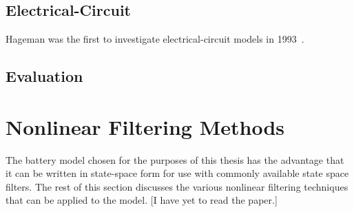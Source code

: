 \documentclass[../zhang_thesis.tex]{subfiles}
\begin{document}
\subsection{Electrical-Circuit}

Hageman was the first to investigate electrical-circuit models in 1993~\cite{hageman93}.

\subsection{Evaluation}

\cite{chen06}


\section{Nonlinear Filtering Methods}
\label{sec:nl_filt}

The battery model chosen for the purposes of this thesis has the advantage that it can be written in state-space form for use with commonly available state space filters. The rest of this section discusses the various nonlinear filtering techniques that can be applied to the model. [I have yet to read the paper.]
\end{document}
